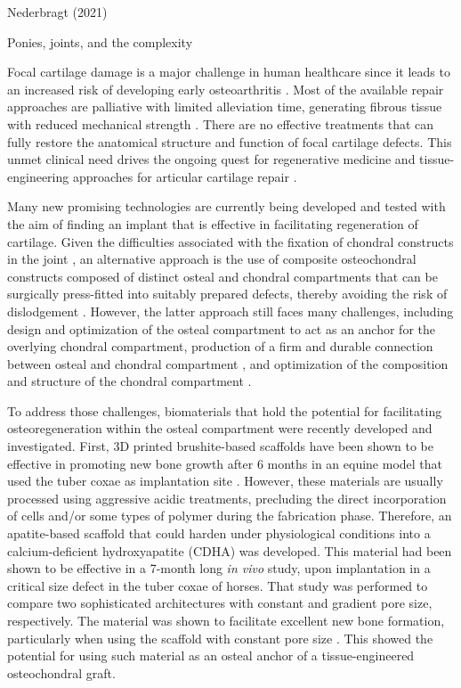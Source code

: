 \documentclass[twocolumn, empirical, authordate, issue]{jote-new-article}
\begin{document}
\begin{companion}{\paperdoi}
Nederbragt (2021)

Ponies, joints, and the complexity


\end{companion}

Focal cartilage damage is a major challenge in human healthcare since it leads to an increased risk of developing early osteoarthritis \parencite{Kloppenburg2020}. Most of the available repair approaches are palliative with limited alleviation time, generating fibrous tissue with reduced mechanical strength \parencite{Kwon2019}. There are no effective treatments that can fully restore the anatomical structure and function of focal cartilage defects. This unmet clinical need drives the ongoing quest for regenerative medicine and tissue-engineering approaches for articular cartilage repair \parencite{Malda2019}.

Many new promising technologies \parencite{Johnstone2019, Patel2019} are currently being developed and tested with the aim of finding an implant that is effective in facilitating regeneration of cartilage. Given the difficulties associated with the fixation of chondral constructs in the joint \parencite{Gotterbarm2008, Mancini2017}, an alternative approach is the use of composite osteochondral constructs composed of distinct osteal and chondral compartments that can be surgically press-fitted into suitably prepared defects, thereby avoiding the risk of dislodgement \parencite{Martin2007}. However, the latter approach still faces many challenges, including design and optimization of the osteal compartment to act as an anchor for the overlying chondral compartment, production of a firm and durable connection between osteal and chondral compartment \parencite{Boushell2017}, and optimization of the composition and structure of the chondral compartment \parencite{Diekman2013, Lee2014}.

To address those challenges, biomaterials that hold the potential for facilitating osteoregeneration within the osteal compartment were recently developed and investigated. First, 3D printed brushite-based scaffolds have been shown to be effective in promoting new bone growth after 6 months in an equine model that used the tuber coxae as implantation site \parencite{VindasBolanos2020}. However, these materials are usually processed using aggressive acidic treatments, precluding the direct incorporation of cells and/or some types of polymer during the fabrication phase. Therefore, an apatite-based scaffold that could harden under physiological conditions into a calcium-deficient hydroxyapatite (CDHA) was developed. This material had been shown to be effective in a 7-month long \emph{in vivo} study, upon implantation in a critical size defect in the tuber coxae of horses. That study was performed to compare two sophisticated architectures with constant and gradient pore size, respectively. The material was shown to facilitate excellent new bone formation, particularly when using the scaffold with constant pore size \parencite{Diloksumpan2020a}. This showed the potential for using such material as an osteal anchor of a tissue-engineered osteochondral graft.
\end{document}
